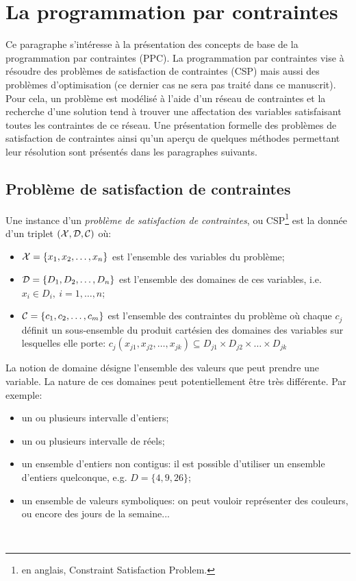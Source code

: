 \section{La programmation par contraintes}

Ce paragraphe s'intéresse à la présentation des concepts de base de la
programmation par contraintes (PPC). La programmation par contraintes
vise à résoudre des problèmes de satisfaction de contraintes (CSP)
mais aussi des problèmes d'optimisation (ce dernier cas ne sera pas
traité dans ce manuscrit). Pour cela, un problème est
modélisé à l'aide d'un réseau de contraintes et la recherche d'une
solution tend à trouver une affectation des variables satisfaisant
toutes les contraintes de ce réseau. Une présentation formelle des
problèmes de satisfaction de contraintes ainsi qu'un aperçu de
quelques méthodes permettant leur résolution sont présentés dans les
paragraphes suivants. 

\subsection{Problème de satisfaction de contraintes}

Une instance d'un {\it problème de satisfaction de contraintes}, ou
CSP\footnote{en anglais, Constraint Satisfaction Problem.} est
la donnée d'un triplet $({\cal X},{\cal D},{\cal C})$ où: 
\begin{itemize}
\item ${\cal X}=\{x_1,x_2,\dots,x_n\}$ est l'ensemble des variables du problème;
\item ${\cal D}=\{D_1,D_2,\dots,D_n\}$ est l'ensemble des domaines de ces
  variables, i.e. $x_i \in D_i,\ i=1,\dots,n$;
\item ${\cal C}=\{c_1,c_2,\dots,c_m\}$ est l'ensemble des contraintes du
  problème où chaque $c_j$ définit un sous-ensemble du produit
  cartésien des domaines des variables sur lesquelles elle porte:
  $c_j(x_{j1},x_{j2},\dots,x_{jk}) \subseteq D_{j1} \times D_{j2}
  \times \dots \times D_{jk}$
\end{itemize}

La notion de domaine désigne l'ensemble des valeurs que peut prendre
une variable. La nature de ces domaines peut potentiellement être très
différente. Par exemple:
\begin{itemize}
\item un ou plusieurs intervalle d'entiers;
\item un ou plusieurs intervalle de réels;
\item un ensemble d'entiers non contigus: il est possible d'utiliser
  un ensemble d'entiers quelconque, e.g. $D=\{4,9,26\}$;
\item un ensemble de valeurs symboliques: on peut vouloir représenter
  des couleurs, ou encore des jours de la semaine... 
\end{itemize}
~

